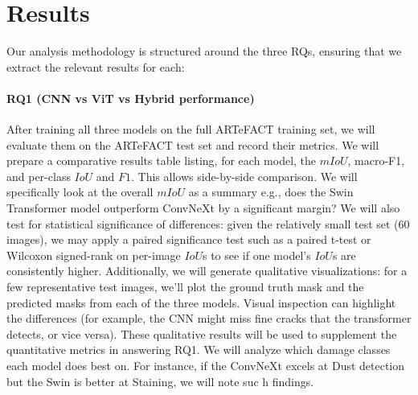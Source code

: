 \documentclass[conference]{IEEEtran}
\begin{document}
\section{Results}
\label{sec:Results}

Our analysis methodology is structured around the three RQs, ensuring that we extract the relevant results for each:

\paragraph*{RQ1 (CNN vs ViT vs Hybrid performance)} After training all three models on the full ARTeFACT training set, we will evaluate them on the ARTeFACT test set and record their metrics. We will prepare a comparative results table listing, for each model, the $mIoU$, macro-F1, and per-class $IoU$ and $F1$. This allows side-by-side comparison. We will specifically look at the overall $mIoU$ as a summary e.g., does the Swin Transformer model outperform ConvNeXt by a significant margin? We will also test for statistical significance of differences: given the relatively small test set (60 images), we may apply a paired significance test such as a paired t-test or Wilcoxon signed-rank on per-image $IoU$s to see if one model's $IoU$s are consistently higher. 
Additionally, we will generate qualitative visualizations: for a few representative test images, we'll plot the ground truth mask and the predicted masks from each of the three models. Visual inspection can highlight the differences (for example, the CNN might miss fine cracks that the transformer detects, or vice versa). These qualitative results will be used to supplement the quantitative metrics in answering RQ1. We will analyze which damage classes each model does best on. For instance, if the ConvNeXt excels at Dust detection but the Swin is better at Staining, we will note suc
h findings.
\end{document}

